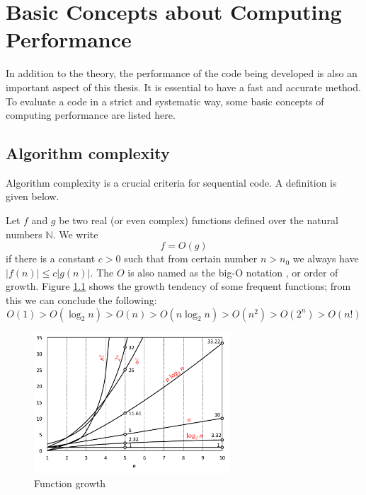 
\chapter{Basic Concepts about Computing Performance\label{chpt:computing-performance}}

In addition to the theory, the performance of the code being developed is
also an important aspect of this thesis. It is essential to
have a fast and accurate method. To evaluate a code in a strict and
systematic way, some basic concepts of computing performance are listed
here. 


\section{Algorithm complexity}

Algorithm complexity is a crucial criteria for sequential code.
A definition is given below.

Let $f$ and $g$ be two real (or even complex) functions defined
over the natural numbers $\mathbb{N}$. We write
\begin{equation}
f=O(g)
\end{equation}
if there is a constant $c>0$ such that from certain number $n>n_{0}$
we always have $\left|f(n)\right|\leq c\left|g(n)\right|.$ The $O$
is also named as the big-O notation \citep{Complexity}, or order
of growth. Figure \ref{fig:order-of-growth} shows the growth tendency
of some frequent functions; from this we can conclude the following: 
\begin{equation}
O(1)>O(\log_{2}n)>O(n)>O(n\log_{2}n)>O(n^{2})>O(2^{n})>O(n!)
\end{equation}


\begin{figure}[h]
\begin{centering}
\includegraphics[width=0.65\textwidth]{_figure/orders-of-growth}
\par\end{centering}

\caption{Function growth\label{fig:order-of-growth}}
\end{figure}


